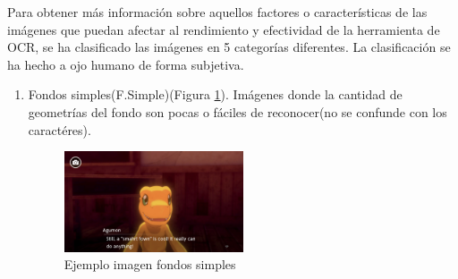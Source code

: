 Para obtener más información sobre aquellos factores o características de las imágenes que puedan afectar al rendimiento y efectividad de la herramienta de OCR, se ha clasificado las imágenes en 5 categorías diferentes. La clasificación se ha hecho a ojo humano de forma subjetiva.
\begin{enumerate}
	\item Fondos simples(F.Simple)(Figura \ref{fig:Fsimple}). Imágenes donde la cantidad de geometrías del fondo son pocas o fáciles de reconocer(no se confunde con los caractéres).
		\begin{figure}[H]
		\centering
		\includegraphics[width = 0.5\textwidth]{Imagenes/OCR/Simple.png}
		\caption{Ejemplo imagen fondos simples }
		\label{fig:Fsimple}
	\end{figure}
	

\end{enumerate}
